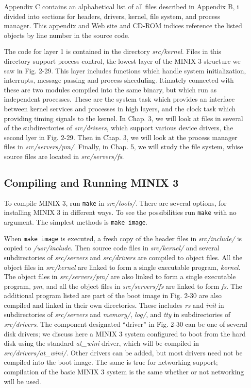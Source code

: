 \documentclass{book}
\newcommand {\sys} [1] {\textsl{#1}}
\newcommand {\cmd} [1] {\texttt{#1}}
\begin{document}
Appendix C contains an alphabetical list of all files described in Appendix B, i
divided into sections for headers, drivers, kernel, file system, and process manager. 
This appendix and Web site and CD-ROM indices reference the listed objects by line number in the source code.

The code for layer 1 is contained in the directory \sys{src/kernel}.
Files in this directory support process control, the lowest layer of the MINIX 3 structure we saw in Fig. 2-29.
This layer includes functions which handle system initialization, interrupts, message passing and process shceduling.
Itimately connected with these are two modules compiled into the same binary,
but which run as independent processes.
These are the system task which provides an interface between kernel services and processes in high layers,
and the clock task which providing timing signals to the kernel.
In Chap. 3, we will look at files in several of the subdirectories of \sys{src/drivers}, which support various device drivers,
the second lyer in Fig. 2-29.
Then in Chap. 3, we will look at the process manager files in \sys{src/servers/pm/}.
Finally, in Chap. 5, we will study the file system, whise source files are located in \sys{src/servers/fs}.

\subsection{Compiling and Running MINIX 3}
To compile MINIX 3, run \cmd{make} in \sys{src/tools/}.
There are several options, for installing MINIX 3 in different ways.
To see the possibilities run \cmd{make} with no argument.
The simplest methods is \cmd{make image}.

When \cmd{make image} is executed, a fresh copy of the header files in \sys{src/include/} is copied to \sys{/usr/include}.
Then source code files in \sys{src/kernel/} and several subdirectories of \sys{src/servers} and \sys{src/drivers} are compiled to object files.
All the object files in \sys{src/kernel} are linked to form a single executable program, \sys{kernel}.
The object files in \sys{src/servers/pm/} are also linked to form a single executable program, \sys{pm},
and all the object files in \sys{src/servers/fs} are linked to form \sys{fs}.
The additional program listed are part of the boot image in Fig. 2-30 are also compiled and linked in their own directories.
These includes \sys{rs} and \sys{init} in subdirectories of \sys{src/servers} 
and \sys{memory/}, \sys{log/}, and \sys{tty} in subdirectories of \sys{src/drivers}.
The component designated ``driver'' in Fig. 2-30 can be one of several disk drivers;
we discuss here a MINIX 3 system configured to boot from the hard disk using the standard \sys{at\_wini} driver, 
which will be compiled in \sys{src/drivers/at\_wini/}.
Other drivers can be added, but most drivers need not be compiled into the boot image.
The same is true for networking support;
compilation of the basic MINIX 3 system is the same whether or not networking will be used.
\end{document}
